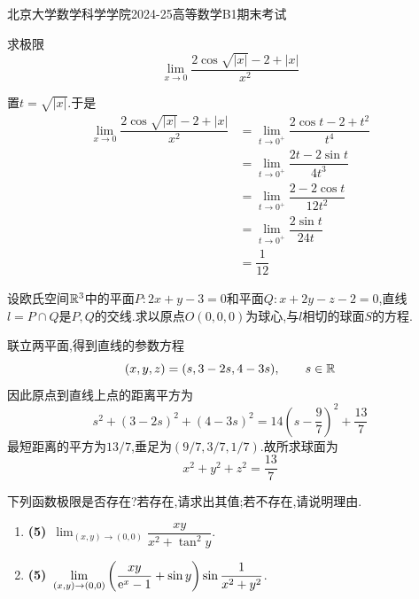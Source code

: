 \documentclass{ctexart}
\begin{document}
\pagestyle{empty}
\begin{center}\Large
北京大学数学科学学院2024-25高等数学B1期末考试
\end{center}
\begin{problem}[1.(10\songti{分})]
求极限\[\lim_{x\to0}\dfrac{2\cos\sqrt{|x|}-2+|x|}{x^2}\]
\end{problem}
\begin{solution}
置$t=\sqrt{|x|}$.于是
    \[\begin{aligned}
        \lim_{x\to0}\dfrac{2\cos\sqrt{|x|}-2+|x|}{x^2}
        &= \lim_{t\to0^+}\dfrac{2\cos t-2+t^2}{t^4} \\
        &= \lim_{t\to0^+}\dfrac{2t-2\sin t}{4t^3} \\
        &= \lim_{t\to0^+}\dfrac{2-2\cos t}{12t^2} \\
        &= \lim_{t\to0^+}\dfrac{2\sin t}{24t} \\
        &= \dfrac{1}{12}
    \end{aligned}\]
\end{solution}
\begin{problem}[2.(10\songti{分})]
设欧氏空间$\mathbb{R}^3$中的平面$P:2x+y-3=0$和平面$Q:x+2y-z-2=0$,直线$l=P\cap Q$是$P,Q$的交线.求以原点$O(0,0,0)$为球心,与$l$相切的球面$S$的方程.
\end{problem}
\begin{solution}
联立两平面,得到直线的参数方程
\[(x,y,z)=(s,3-2s,4-3s),\qquad s\in\mathbb{R}\]
因此原点到直线上点的距离平方为
\[s^2+(3-2s)^2+(4-3s)^2=14\left(s-\dfrac97\right)^2+\dfrac{13}{7}\]
最短距离的平方为$13/7$,垂足为$(9/7,3/7,1/7)$.故所求球面为
\[x^2+y^2+z^2=\dfrac{13}{7}\]
\end{solution}
\begin{problem}[3.(10\songti{分})]
下列函数极限是否存在?若存在,请求出其值;若不存在,请说明理由.
        \begin{enumerate}[label=\tbf{(\arabic*)}]
            \item \textbf{(5)}\ \(\displaystyle\lim_{(x,y)\to(0,0)}\dfrac{xy}{x^2+\tan^2y}\).
            \item \textbf{(5)}\ \(\displaystyle\lim_{(x,y)\to(0,0)}\left(\dfrac{xy}{\mathrm{e}^x-1}+\sin y\right)\sin\dfrac{1}{x^2+y^2}\).
        \end{enumerate}
\end{problem}
\end{document}
